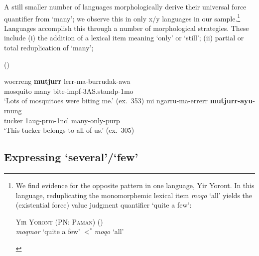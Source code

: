 \documentclass[12pt,egregdoesnotlikesansseriftitles]{scrartcl}
\begin{document}
 A still smaller number of languages morphologically derive their universal force quantifier from `many'; we observe this in only x/y languages in our sample.\footnote{We find evidence for the opposite pattern in one language, Yir Yoront. In this language, reduplicating the monomorphemic lexical item {\it moqo} `all' yields the (existential force) value judgment quantifier `quite a few':

\begin{exe}
  \ex \textsc{Yir Yoront (PN: Paman)} (\citealt[375]{alpher73})\\
  \textit{\charis moqmor} `quite a few' $<^*$\textit{\charis moqo} `all'
\end{exe}}  Languages accomplish this  through a number of morphological strategies. These include (i) the addition of a lexical item meaning `only' or `still'; (ii) partial or total reduplication of `many'; 


\begin{exe}
   (\citealt{zandvoort99})
  \begin{xlist}
    \ex \gll woerreng \textbf{mutjurr} lerr-ma-burrudak-awa\\
    mosquito many bite-{\sc impf}-3AS.stand{\sc p}-1{\sc mo}\\
    \glt `Lots of mosquitoes were biting me.' (ex.~353) %
    \ex \gll mi ngarru-ma-errerr \textbf{mutjurr-ayu}-rnung\\
    tucker 1{\sc aug-prm}-1{\sc ncl} many-only-{\sc purp}\\
    \glt `This tucker belongs to all of us.' (ex.~305)
    \end{xlist}
\end{exe}


 
 

\subsection{Expressing `several'/`few'}
\end{document}
